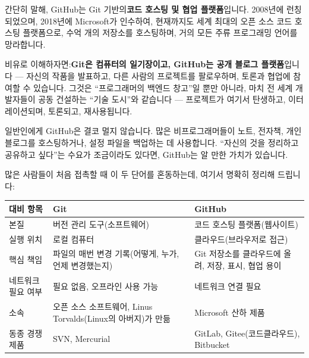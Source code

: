 


간단히 말해, GitHub는 Git 기반의\textbf{코드 호스팅 및 협업 플랫폼}입니다. 2008년에 런칭되었으며, 2018년에 Microsoft가 인수하여, 현재까지도 세계 최대의 오픈 소스 코드 호스팅 플랫폼으로, 수억 개의 저장소를 호스팅하며, 거의 모든 주류 프로그래밍 언어를 망라합니다.

비유로 이해하자면:\textbf{Git은 컴퓨터의 일기장이고, GitHub는 공개 블로그 플랫폼}입니다 — 자신의 작품을 발표하고, 다른 사람의 프로젝트를 팔로우하며, 토론과 협업에 참여할 수 있습니다. 그것은 “프로그래머의 백엔드 창고”일 뿐만 아니라, 마치 전 세계 개발자들이 공동 건설하는 “기술 도시”와 같습니다 — 프로젝트가 여기서 탄생하고, 이터레이션되며, 토론되고, 재사용됩니다.

일반인에게 GitHub은 결코 멀지 않습니다. 많은 비프로그래머들이 노트, 전자책, 개인 블로그를 호스팅하거나, 설정 파일을 백업하는 데 사용합니다. “자신의 것을 정리하고 공유하고 싶다”는 수요가 조금이라도 있다면, GitHub는 알 만한 가치가 있습니다.


많은 사람들이 처음 접촉할 때 이 두 단어를 혼동하는데, 여기서 명확히 정리해 드립니다:

\begin{center}
\begin{tabularx}{\linewidth}{|X|X|X|}
\hline
\textbf{대비 항목} & \textbf{Git} & \textbf{GitHub} \tabularnewline
\hline
본질 & 버전 관리 도구(소프트웨어) & 코드 호스팅 플랫폼(웹사이트) \tabularnewline
실행 위치 & 로컬 컴퓨터 & 클라우드(브라우저로 접근) \tabularnewline
핵심 책임 & 파일의 매번 변경 기록(어떻게, 누가, 언제 변경했는지) & Git 저장소를 클라우드에 올려, 저장, 표시, 협업 용이 \tabularnewline
네트워크 필요 여부 & 필요 없음, 오프라인 사용 가능 & 네트워크 연결 필요 \tabularnewline
소속 & 오픈 소스 소프트웨어, Linus Torvalds(Linux의 아버지)가 만듦 & Microsoft 산하 제품 \tabularnewline
동종 경쟁 제품 & SVN, Mercurial & GitLab, Gitee(코드클라우드), Bitbucket \tabularnewline
\hline
\end{tabularx}
\end{center}

